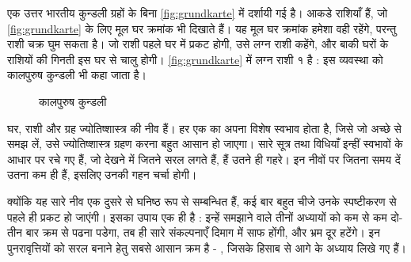 एक उत्तर भारतीय कुन्डली ग्रहों के बिना \autoref{fig:grundkarte} में दर्शायी गई है। आकडे राशियाँ हैं, जो \autoref{fig:grundkarte} के लिए मूल घर क्रमांक भी दिखाते हैं। यह मूल घर क्रमांक हमेशा वही रहेंगे, परन्तु राशी चक्र घुम सकता है। जो राशी पहले घर में प्रकट होगी, उसे लग्न राशी कहेंगे, और बाकी घरों के राशियों की गिनती इस घर से चालु होगी। \autoref{fig:grundkarte} में लग्न राशी १ है : इस व्यवस्था को कालपुरुष कुन्डली भी कहा जाता है।
\begin{figure}[bth]
    \centering
{}
\caption{कालपुरुष कुन्डली}
\label{fig:grundkarte}
\end{figure}

घर, राशी और ग्रह ज्योतिष्शास्त्र की नीव हैं। हर एक का अपना विशेष स्वभाव होता है, जिसे जो अच्छे से समझ लें, उसे ज्योतिष्शास्त्र ग्रहण करना बहुत आसान हो जाएगा। सारे सूत्र तथा विधियाँ इन्हीं स्वभावों के आधार पर रचे गए हैं, जो देखने में जितने सरल लगते हैं, हैं उतने ही गहरे। इन नीवों पर जितना समय दें उतना कम ही हैं, इसलिए उनकी गहन चर्चा होगी।

क्योंकि यह सारे नीव एक दुसरे से घनिष्ठ रूप से सम्बन्धित  हैं, कई बार बहुत चीजे उनके स्पष्टीकरण से पहले ही प्रकट हो जाएंगी। इसका उपाय एक ही है : इन्हें समझाने वाले तीनों अध्यायों को कम से कम दो-तीन बार क्रम से पढना पडेगा, तब ही सारे संकल्पनाएँ दिमाग में साफ होंगी, और भ्रम दूर हटेंगे। इन पुनरावृत्तियों को सरल बनाने हेतु सबसे आसान क्रम है - , जिसके हिसाब से आगे के अध्याय लिखे गए हैं।
